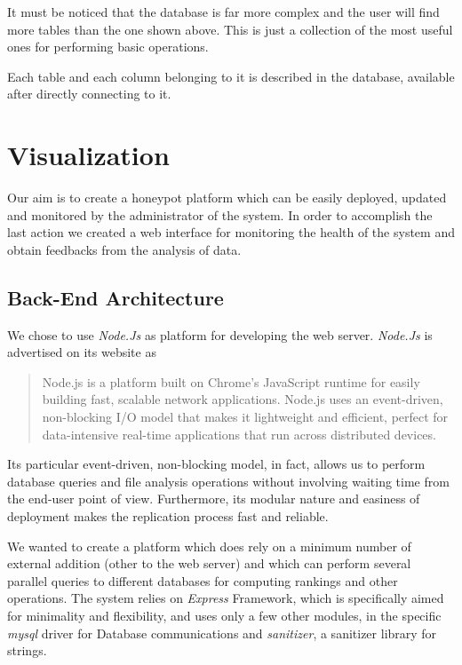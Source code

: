It must be noticed that the database is far more complex and the user will find more tables than the one shown above. This is just a collection of the most useful ones for performing basic operations.

Each table and each column belonging to it is described in the database, available after directly connecting to it.

\section{Visualization}

Our aim is to create a honeypot platform which can be easily deployed, updated and monitored by the administrator of the system. In order to accomplish the last action we created a web interface for monitoring the health of the system and obtain feedbacks from the analysis of data.

\subsection{Back-End Architecture}

We chose to use \emph{Node.Js} as platform for developing the web server. \emph{Node.Js} is advertised on its website \cite{node_home} as
\begin{quotation}
Node.js is a platform built on Chrome's JavaScript runtime for easily building fast, scalable network applications. Node.js uses an event-driven, non-blocking I/O model that makes it lightweight and efficient, perfect for data-intensive real-time applications that run across distributed devices.
\end{quotation}

Its particular event-driven, non-blocking model, in fact, allows us to perform database queries and file analysis operations without involving waiting time from the end-user point of view. Furthermore, its modular nature and easiness of deployment makes the replication process fast and reliable.

We wanted to create a platform which does rely on a minimum number of external addition (other to the web server) and which can perform several parallel queries to different databases for computing rankings and other operations. The system relies on \emph{Express} \cite{express_node} Framework, which is specifically aimed for minimality and flexibility, and uses only a few other modules, in the specific \emph{mysql} driver for Database communications and \emph{sanitizer}, a sanitizer library for strings.

